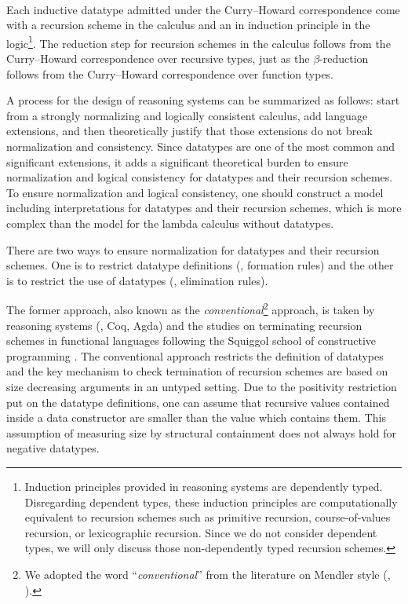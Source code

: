 \paragraph{}
Each inductive datatype admitted under the Curry--Howard correspondence
come with a recursion scheme in the calculus and an in induction principle in the logic\footnote{
        Induction principles provided in reasoning systems are
        dependently typed. Disregarding dependent types, these
        induction principles are computationally equivalent to
        recursion schemes such as primitive recursion,
        course-of-values recursion, or lexicographic recursion.
        Since we do not consider dependent types, we will only discuss
        those non-dependently typed recursion schemes.}.
The reduction step for recursion schemes in the calculus follows from
the Curry--Howard correspondence over recursive types, just as
the $\beta$-reduction follows from the Curry--Howard correspondence
over function types.

A process for the design of reasoning systems can be summarized as follows: 
start from a strongly normalizing and logically consistent calculus,
add language extensions, and then theoretically justify that those extensions
do not break normalization and consistency. Since datatypes are one of the most
common and significant extensions, it adds a significant theoretical burden to
ensure normalization and logical consistency for datatypes and their recursion
schemes. To ensure normalization and logical consistency, one should construct
a model including interpretations for datatypes and their recursion schemes,
which is more complex than the model for the lambda calculus without datatypes.

There are two ways to ensure normalization for datatypes and their recursion
schemes. One is to restrict datatype definitions (\ie, formation rules) and
the other is to restrict the use of datatypes (\ie, elimination rules).

The former approach, also known as the \emph{conventional}\footnote{
        We adopted the word ``\emph{conventional}'' from the literature
        on Mendler style (\eg, \cite{AbeMat04}).}
approach, is taken by reasoning systems (\eg, Coq, Agda) and the studies on
terminating recursion schemes in functional languages following
the Squiggol school of constructive programming \cite{AoP,hagino87phd,Bir87}.
The conventional approach restricts the definition of datatypes and
the key mechanism to check termination of recursion schemes are based on
size decreasing arguments in an untyped setting. Due to the positivity
restriction put on the datatype definitions, one can assume that
recursive values contained inside a data constructor are smaller than
the value which contains them. This assumption of measuring size by
structural containment does not always hold for negative datatypes.


